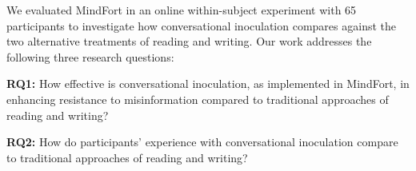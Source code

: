 \documentclass[sigconf]{acmart}
\begin{document}
We evaluated MindFort in an online within-subject experiment with 65 participants to investigate how conversational inoculation compares against the two alternative treatments of reading and writing. 
Our work addresses the following three research questions:

\textbf{RQ1:} How effective is conversational inoculation, as implemented in MindFort, in enhancing resistance to misinformation compared to traditional approaches of reading and writing?




\textbf{RQ2:} How do participants' experience with conversational inoculation compare to traditional approaches of reading and writing?
\end{document}
